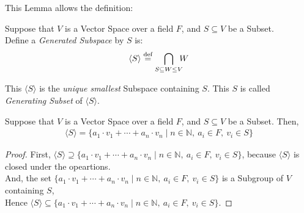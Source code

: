 This Lemma allows the definition:
\begin{definition}
    Suppose that $V$ is a Vector Space over a field $F$, and $S \subseteq V$ be a Subset. \\
    Define a \textit{Generated Subspace} by $S$ is:
    \begin{align*}
        \langle S \rangle \defequal \bigcap_{S \subseteq W \leq V} \hspace{-0.2cm} W
    \end{align*}
\end{definition}
This $\langle S \rangle$ is the \textit{unique smallest} Subspace containing $S$. This $S$ is called \textit{Generating Subset} of $\langle S \rangle$.
\begin{lemma}
    Suppose that $V$ is a Vector Space over a field $F$, and $S \subseteq V$ be a Subset. Then,
    \begin{align*}
        \langle S \rangle = \{ a_1 \cdot v_1 + \cdots + a_n \cdot v_n \mid n \in \mathbb{N},\ a_i \in F,\ v_i \in S \}
    \end{align*}
\end{lemma}
\begin{proof}
    First, $\langle S \rangle \supseteq \{ a_1 \cdot v_1 + \cdots + a_n \cdot v_n \mid n \in \mathbb{N},\ a_i \in F,\ v_i \in S \}$, because $\langle S \rangle$ is closed under the opeartions. \\
    And, the set $\{ a_1 \cdot v_1 + \cdots + a_n \cdot v_n \mid n \in \mathbb{N},\ a_i \in F,\ v_i \in S \}$ is a Subgroup of $V$ containing $S$, \\
    Hence $\langle S \rangle \subseteq \{ a_1 \cdot v_1 + \cdots + a_n \cdot v_n \mid n \in \mathbb{N},\ a_i \in F,\ v_i \in S \}$.
\end{proof}

